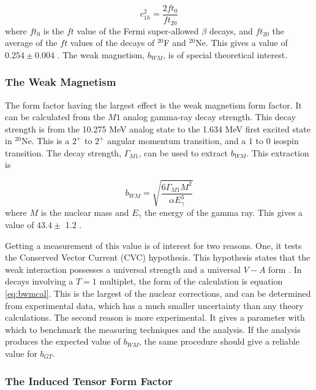 \documentclass[../MaxHughesThesis.tex]{subfiles}
\begin{document}
\begin{equation}
	c_{1h}^{2} = \frac{2 ft_{0}}{ft_{20}}
	\label{eq:c1eq}
\end{equation}
where $ft_{0}$ is the $ft$ value of the Fermi super-allowed $\beta$ decays, and $ft_{20}$ the average of the $ft$ values of the decays of $^{20}$F and $^{20}$Ne.
This gives a value of $0.254 \pm 0.004$ \cite{Min11}.
The weak magnetism, $b_{WM}$, is of special theoretical interest. 

\subsubsection{The Weak Magnetism}
The form factor having the largest effect is the weak magnetism form factor. 
It can be calculated from the $M1$ analog gamma-ray decay strength.
This decay strength is from the 10.275 MeV analog state to the 1.634 MeV first excited state in $^{20}$Ne.
This is a $2^{+}$ to $2^{+}$ angular momentum transition, and a $1$ to $0$ isospin transition.
The decay strength, $\Gamma_{M1}$, can be used to extract $b_{WM}$.
This extraction is 

\begin{equation}
	b_{WM} = \sqrt{\frac{6\Gamma_{M1}M^{2}}{\alpha E_{\gamma}^{3}}}
	\label{eq:bwmcal}
\end{equation}
where $M$ is the nuclear mass and $E_{\gamma}$ the energy of the gamma ray.
This gives a value of $43.4 \pm$ 1.2 \cite{Min11}.

Getting a measurement of this value is of interest for two reasons.
One, it tests the Conserved Vector Current (CVC) hypothesis.
This hypothesis states that the weak interaction possesses a universal strength and a universal $V-A$ form \cite{Man58}.
In decays involving a $T = 1$ multiplet, the form of the calculation is equation \ref{eq:bwmcal}. 
This is the largest of the nuclear corrections, and can be determined from experimental data, which has a much smaller uncertainty than any theory calculations.
The second reason is more experimental.
It gives a parameter with which to benchmark the measuring techniques and the analysis.
If the analysis produces the expected value of $b_{WM}$, the same procedure should give a reliable value for $b_{GT}$.

\subsubsection{The Induced Tensor Form Factor}
\end{document}
